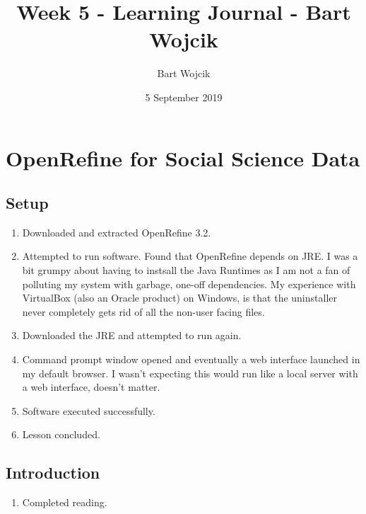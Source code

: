 \documentclass{article}
\title{Week 5 - Learning Journal   - Bart Wojcik}
\author{Bart Wojcik}
\date{5 September 2019}
\begin{document}
\maketitle

\section{OpenRefine for Social Science Data}
\subsection{Setup}
\begin{enumerate}
    \item Downloaded and extracted OpenRefine 3.2.
    \item Attempted to run software. Found that OpenRefine depends on JRE. I was a bit grumpy about having to instsall the Java Runtimes as I am not a fan of polluting my system with garbage, one-off dependencies. My experience with VirtualBox (also an Oracle product) on Windows, is that the uninstaller never completely gets rid of all the non-user facing files.
    \item Downloaded the JRE and attempted to run again.
    \item Command prompt window opened and eventually a web interface launched in my default browser. I wasn't expecting this would run like a local server with a web interface, doesn't matter.
    \item Software executed successfully.
    \item Lesson concluded.
\end{enumerate}
\subsection{Introduction}
\begin{enumerate}
    \item Completed reading.
\end{enumerate}
\end{document}
